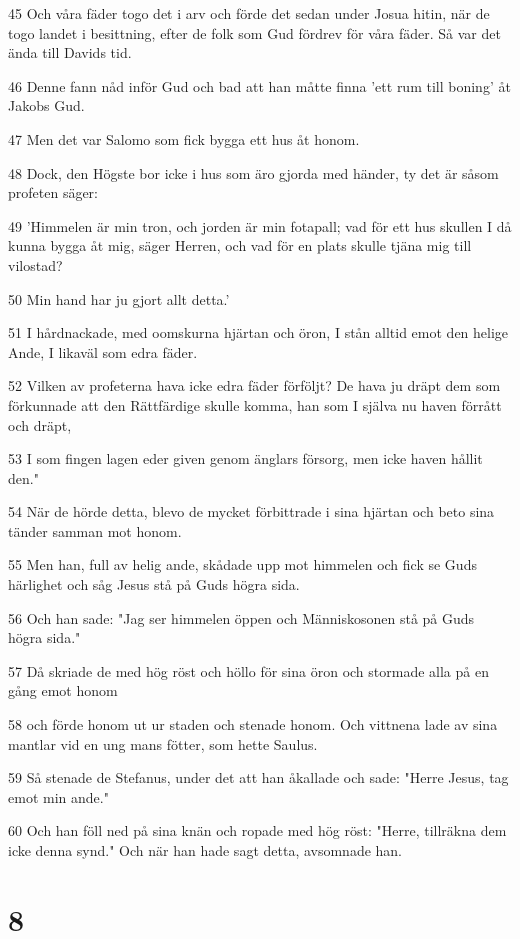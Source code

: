 \par 45 Och våra fäder togo det i arv och förde det sedan under Josua hitin, när de togo landet i besittning, efter de folk som Gud fördrev för våra fäder. Så var det ända till Davids tid.
\par 46 Denne fann nåd inför Gud och bad att han måtte finna 'ett rum till boning' åt Jakobs Gud.
\par 47 Men det var Salomo som fick bygga ett hus åt honom.
\par 48 Dock, den Högste bor icke i hus som äro gjorda med händer, ty det är såsom profeten säger:
\par 49 'Himmelen är min tron, och jorden är min fotapall; vad för ett hus skullen I då kunna bygga åt mig, säger Herren, och vad för en plats skulle tjäna mig till vilostad?
\par 50 Min hand har ju gjort allt detta.'
\par 51 I hårdnackade, med oomskurna hjärtan och öron, I stån alltid emot den helige Ande, I likaväl som edra fäder.
\par 52 Vilken av profeterna hava icke edra fäder förföljt? De hava ju dräpt dem som förkunnade att den Rättfärdige skulle komma, han som I själva nu haven förrått och dräpt,
\par 53 I som fingen lagen eder given genom änglars försorg, men icke haven hållit den."
\par 54 När de hörde detta, blevo de mycket förbittrade i sina hjärtan och beto sina tänder samman mot honom.
\par 55 Men han, full av helig ande, skådade upp mot himmelen och fick se Guds härlighet och såg Jesus stå på Guds högra sida.
\par 56 Och han sade: "Jag ser himmelen öppen och Människosonen stå på Guds högra sida."
\par 57 Då skriade de med hög röst och höllo för sina öron och stormade alla på en gång emot honom
\par 58 och förde honom ut ur staden och stenade honom. Och vittnena lade av sina mantlar vid en ung mans fötter, som hette Saulus.
\par 59 Så stenade de Stefanus, under det att han åkallade och sade: "Herre Jesus, tag emot min ande."
\par 60 Och han föll ned på sina knän och ropade med hög röst: "Herre, tillräkna dem icke denna synd." Och när han hade sagt detta, avsomnade han.

\chapter{8}

